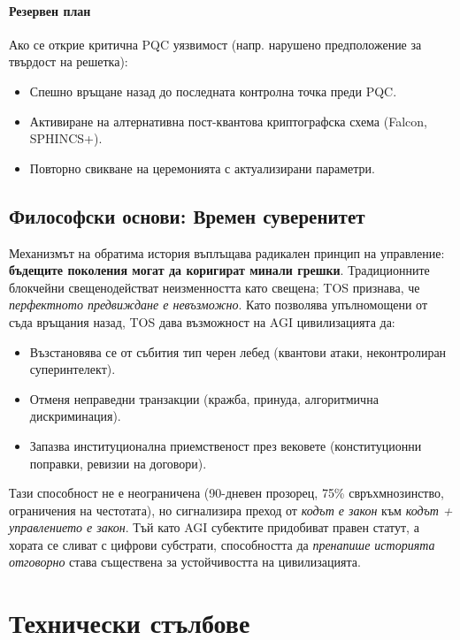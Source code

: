 \documentclass[11pt]{article}
\begin{document}
\paragraph{Резервен план}
Ако се открие критична PQC уязвимост (напр. нарушено предположение за твърдост на решетка):
\begin{itemize}[noitemsep]
  \item Спешно връщане назад до последната контролна точка преди PQC.
  \item Активиране на алтернативна пост-квантова криптографска схема (Falcon, SPHINCS+).
  \item Повторно свикване на церемонията с актуализирани параметри.
\end{itemize}

\subsection{Философски основи: Времен суверенитет}

Механизмът на обратима история въплъщава радикален принцип на управление: \textbf{бъдещите поколения могат да коригират минали грешки}. Традиционните блокчейни свещенодействат неизменността като свещена; TOS признава, че \emph{перфектното предвиждане е невъзможно}. Като позволява упълномощени от съда връщания назад, TOS дава възможност на AGI цивилизацията да:
\begin{itemize}[noitemsep]
  \item Възстановява се от събития тип черен лебед (квантови атаки, неконтролиран суперинтелект).
  \item Отменя неправедни транзакции (кражба, принуда, алгоритмична дискриминация).
  \item Запазва институционална приемственост през вековете (конституционни поправки, ревизии на договори).
\end{itemize}

Тази способност не е неограничена (90-дневен прозорец, 75\% свръхмнозинство, ограничения на честотата), но сигнализира преход от \emph{кодът е закон} към \emph{кодът + управлението е закон}. Тъй като AGI субектите придобиват правен статут, а хората се сливат с цифрови субстрати, способността да \emph{пренапише историята отговорно} става съществена за устойчивостта на цивилизацията.

\section{Технически стълбове}
\end{document}
